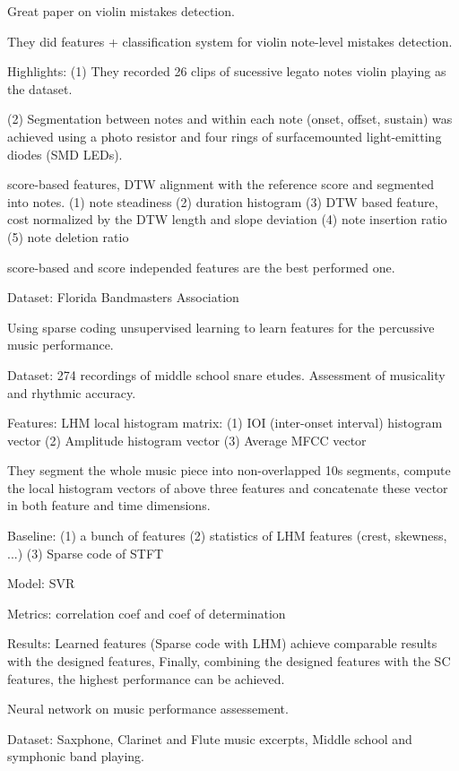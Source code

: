  Great paper on violin mistakes detection.

They did features + classification system for violin note-level mistakes detection.

Highlights:
(1) They recorded 26 clips of sucessive legato notes violin playing as the dataset.

(2) Segmentation between notes and within each note (onset, offset, sustain) was achieved using a photo resistor and four rings of surfacemounted light-emitting diodes (SMD LEDs).

 score-based features, DTW alignment with the reference score and segmented into notes.
(1) note steadiness
(2) duration histogram
(3) DTW based feature, cost normalized by the DTW length and slope deviation
(4) note insertion ratio
(5) note deletion ratio

score-based and score independed features are the best performed one.

Dataset:
Florida Bandmasters Association

 Using sparse coding unsupervised learning to learn features for the percussive music performance.

Dataset: 274 recordings of middle school snare etudes. Assessment of musicality and rhythmic accuracy. 

Features:
LHM local histogram matrix:
(1) IOI (inter-onset interval) histogram vector
(2) Amplitude histogram vector
(3) Average MFCC vector

They segment the whole music piece into non-overlapped 10s segments, compute the local histogram vectors of above three features and concatenate these vector in both feature and time dimensions.

Baseline:
(1) a bunch of features
(2) statistics of LHM features (crest, skewness, ...)
(3) Sparse code of STFT

Model:
SVR

Metrics:
correlation coef and coef of determination

Results:
Learned features (Sparse code with LHM) achieve comparable results with the designed features,  Finally, combining the designed features with the SC features, the highest performance can be achieved.

 Neural network on music performance assessement.

Dataset: Saxphone, Clarinet and Flute music excerpts, Middle school and symphonic band playing.

